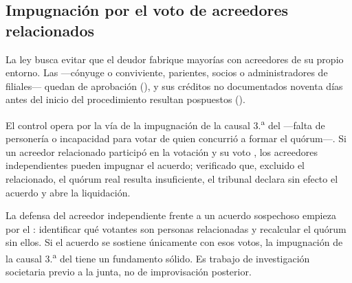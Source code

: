 \subsection{Impugnación por el voto de acreedores relacionados}

La ley busca evitar que el deudor fabrique mayorías con acreedores de su propio entorno. Las
 ---cónyuge o conviviente, parientes, socios o administradores de
filiales--- quedan  de aprobación (), y sus
créditos no documentados noventa días antes del inicio del procedimiento resultan pospuestos
().

El control opera por la vía de la impugnación de la causal 3.\textsuperscript{a} del 
---falta de personería o incapacidad para votar de quien concurrió a formar el quórum---. Si un
acreedor relacionado participó en la votación y su voto ,
los acreedores independientes pueden impugnar el acuerdo; verificado que, excluido el relacionado,
el quórum real resulta insuficiente, el tribunal declara sin efecto el acuerdo y abre la
liquidación.

\begin{practica}
La defensa del acreedor independiente frente a un acuerdo sospechoso empieza por el
: identificar qué votantes son personas relacionadas y recalcular el
quórum sin ellos. Si el acuerdo se sostiene únicamente con esos votos, la impugnación de la causal
3.\textsuperscript{a} del  tiene un fundamento sólido. Es trabajo de investigación
societaria previo a la junta, no de improvisación posterior.
\end{practica}
